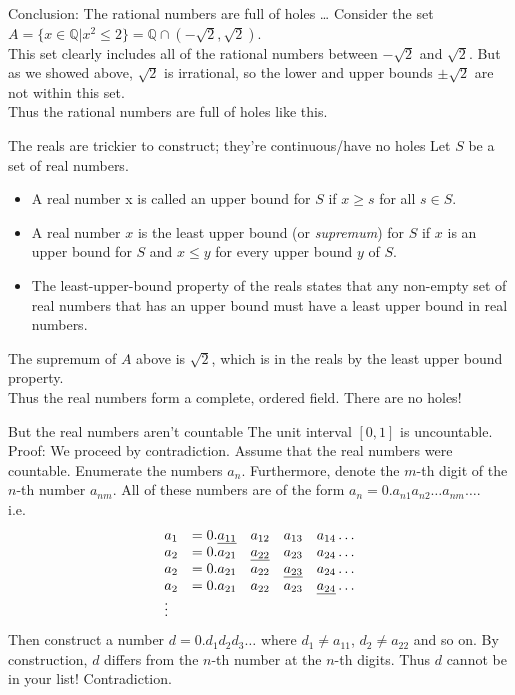 \documentclass{beamer}
\begin{document}
\begin{frame}{Conclusion: The rational numbers are full of holes \ldots}
Consider the set\\
$A = \{ x \in \mathbb{Q} | x^2 \leq 2 \} = \mathbb{Q} \cap (-\sqrt{2}, \sqrt{2})$.\\
This set clearly includes all of the rational numbers between $-\sqrt{2}$ and $\sqrt{2}$. But as we showed above, $\sqrt{2}$
is irrational, so the lower and upper bounds $\pm\sqrt{2}$ are not within this set.\\
Thus the rational numbers are full of holes like this.
\end{frame}


\begin{frame}{The reals are trickier to construct; they're continuous/have no holes}
Let $S$ be a set of real numbers.
\begin{itemize}
\item A real number x is called an upper bound for $S$ if $x \geq s$ for all $s \in S$. \\
\item A real number $x$ is the least upper bound (or \emph{supremum}) for $S$ if $x$ is an upper bound for $S$ and $x \leq y$ for every upper bound $y$ of $S$.\\
\item The least-upper-bound property of the reals states that any non-empty set of real numbers that has an upper bound must have a least upper bound in real numbers.
\end{itemize}
The supremum of $A$ above is $\sqrt{2}$, which is in the reals by the least upper bound property.\\
Thus the real numbers form a complete, ordered field. There are no holes!
\end{frame}


\begin{frame}{But the real numbers aren't countable}
The unit interval $[0, 1]$ is uncountable. \\
Proof:
We proceed by contradiction. Assume that the real numbers were countable.
Enumerate the numbers $a_n$. Furthermore, denote the $m$-th digit of the $n$-th number $a_{nm}.$
All of these numbers are of the form $a_n = 0.a_{n1} a_{n2} \ldots a_{nm} \ldots$.
\\
i.e.
\begin{equation*}
\begin{array}{llllll}
a_{1} &= 0.\emph{a_{11}} &a_{12} &a_{13} &a_{14} \ldots \\
a_{2} &= 0.a_{21} &\emph{a_{22}} &a_{23} &a_{24} \ldots \\
a_{2} &= 0.a_{21} &a_{22} &\emph{a_{23}} &a_{24} \ldots \\
a_{2} &= 0.a_{21} &a_{22} &a_{23} &\emph{a_{24}} \ldots \\
\vdots
\end{array}
\end{equation*}
Then construct a number $d = 0.d_1 d_2 d_3 \ldots$ where $d_1 \ne a_{11}$, $d_2 \ne a_{22}$ and
so on. By construction, $d$ differs from the $n$-th number at the $n$-th digits. Thus $d$ cannot be in your
list! Contradiction.
\end{frame}
\end{document}
